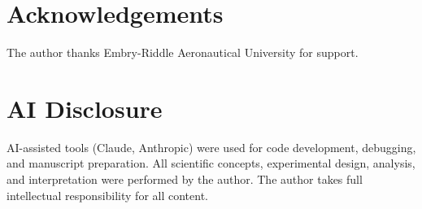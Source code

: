\documentclass[final,3p,times,twocolumn]{elsarticle}
\begin{document}
\section*{Acknowledgements}

The author thanks Embry-Riddle Aeronautical University for support.

\appendix

\section{AI Disclosure}
AI-assisted tools (Claude, Anthropic) were used for code development,
debugging, and manuscript preparation. All scientific concepts, experimental
design, analysis, and interpretation were performed by the author. The
author takes full intellectual responsibility for all content.



\end{document}
